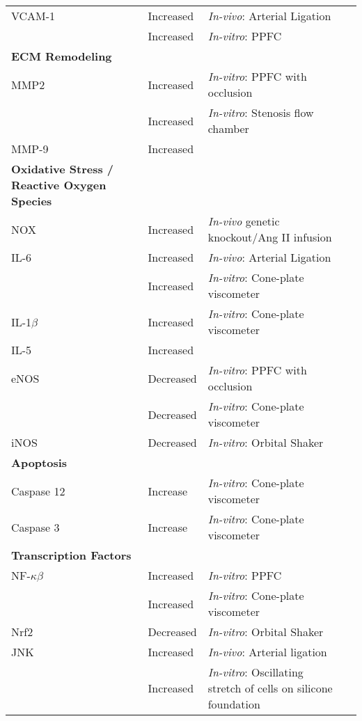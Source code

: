 \begin{table}[h]
{\begin{tabular}{|p{70mm}|p{50mm}|l|l|}
VCAM-1 & Increased & \textit{In-vivo}: Arterial Ligation & \cite{xanthis2019beta1} \\
& Increased & \textit{In-vitro}: PPFC & \cite{bailey2019mechanoregulation}\\
\hline
\textbf{ECM Remodeling} & & & \\
MMP2 & Increased & \textit{In-vitro}: PPFC with occlusion & \cite{balaguru2016disturbed} \\
& Increased & \textit{In-vitro}: Stenosis flow chamber & \cite{2017stenosis} \\
MMP-9 & Increased &  & \cite{cooper2018increased} \\
\hline
\textbf{Oxidative Stress / Reactive Oxygen Species} & & & \\
NOX & Increased & \textit{In-vivo} genetic knockout/Ang II infusion & \cite{siu2017nox} \\
IL-6 & Increased & \textit{In-vivo}: Arterial Ligation & \cite{sheinberg2019endothelial} \\
& Increased & \textit{In-vitro}: Cone-plate viscometer & \cite{go2014disturbed} \\
IL-1$\beta$ & Increased & \textit{In-vitro}: Cone-plate viscometer & \cite{pan2017shear} \\
IL-5 & Increased & & \cite{baratchi2017molecular} \\
eNOS & Decreased & \textit{In-vitro}: PPFC with occlusion & \cite{harding2018pro} \\
& Decreased & \textit{In-vitro}: Cone-plate viscometer & \cite{bibli2020shear} \\
iNOS & Decreased & \textit{In-vitro}: Orbital Shaker & \cite{mao2014flow} \\
\hline
\textbf{Apoptosis} & & & \\
Caspase 12 & Increase & \textit{In-vitro}: Cone-plate viscometer & \cite{pan2017shear} \\
Caspase 3 & Increase & \textit{In-vitro}: Cone-plate viscometer & \cite{heo2015disturbed} \\
\hline
\textbf{Transcription Factors} & & & \\
NF-$\kappa\beta$ & Increased & \textit{In-vitro}: PPFC & \cite{baeriswyl2019disturbed} \\
& Increased & \textit{In-vitro}: Cone-plate viscometer & \cite{go2014disturbed} \\
Nrf2 & Decreased & \textit{In-vitro}: Orbital Shaker & \cite{martin2014unspliced} \\
JNK & Increased & \textit{In-vivo}: Arterial ligation & \cite{wang2016integrin} \\
& Increased & \textit{In-vitro}: Oscillating stretch of cells on silicone foundation & \cite{codelia2014regulation}\\
 \hline
\end{tabular}}
\label{Distrubed_flow_impact_table}
\end{table}

